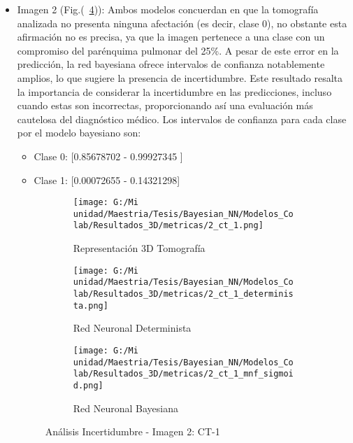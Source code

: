 \documentclass[10pt, oneside, a4paper]{article}
\begin{document}
\begin{itemize}
\begin{itemize}
	\item Imagen 2 (Fig.(~\ref{fig:layout_2})): Ambos modelos concuerdan en que la tomografía analizada no presenta ninguna afectación (es decir, clase 0), no obstante esta afirmación no es precisa, ya que la imagen pertenece a una clase con un compromiso del parénquima pulmonar del 25\%. A pesar de este error en la predicción, la red bayesiana ofrece intervalos de confianza notablemente amplios, lo que sugiere la presencia de incertidumbre. Este resultado resalta la importancia de considerar la incertidumbre en las predicciones, incluso cuando estas son incorrectas, proporcionando así una evaluación más cautelosa del diagnóstico médico.
	Los intervalos de confianza para cada clase por el modelo bayesiano son:
	
	\begin{itemize}
	\item Clase 0: [0.85678702 - 0.99927345 ]
	\item Clase 1: [0.00072655 - 0.14321298]
	\end{itemize}

\begin{figure}[H]
	\centering
	\begin{subfigure}[b]{0.6\textwidth}
		\centering
		\texttt{[image: G:/Mi unidad/Maestria/Tesis/Bayesian\_NN/Modelos\_Colab/Resultados\_3D/metricas/2\_ct\_1.png]} %
		\caption{Representación 3D Tomografía}
		\label{fig:2_ct1_1}
	\end{subfigure}
	
	\medskip
	
	\begin{subfigure}[b]{0.45\textwidth}
		\centering
		\texttt{[image: G:/Mi unidad/Maestria/Tesis/Bayesian\_NN/Modelos\_Colab/Resultados\_3D/metricas/2\_ct\_1\_determinista.png]}
		\caption{Red Neuronal Determinista}
		\label{fig:2_ct1_2}
	\end{subfigure}
	\hfill
	\begin{subfigure}[b]{0.45\textwidth}
		\centering
		\texttt{[image: G:/Mi unidad/Maestria/Tesis/Bayesian\_NN/Modelos\_Colab/Resultados\_3D/metricas/2\_ct\_1\_mnf\_sigmoid.png]}
		\caption{Red Neuronal Bayesiana}
		\label{fig:2_ct1_3}
	\end{subfigure}
	
	\caption{Análisis Incertidumbre - Imagen 2: CT-1}
	\label{fig:layout_2}
\end{figure}	
	
	\end{itemize}
	

\end{itemize}
\end{document}
